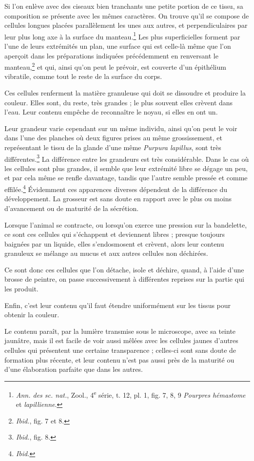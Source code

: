 \documentclass[a4paper, 11pt, oneside, polutonikogreek, french]{article}
\begin{document}
Si l'on enlève avec des ciseaux bien tranchants une petite portion de ce tissu, sa composition se présente avec les mêmes caractères. On trouve qu'il se compose de cellules longues placées parallèlement les unes aux autres, et perpendiculaires par leur plus long axe à la surface du manteau.\footnote{\emph{Ann. des sc. nat.}, Zool., 4\textsuperscript{e} série, t. 12, pl. 1, fig. 7, 8, 9 \emph{Pourpres hémastome} et \emph{lapillienne}.} Les plus superficielles forment par l'une de leurs extrémités un plan, une surface qui est celle-là même que l'on aperçoit dans les préparations indiquées précédemment en renversant le manteau,\footnote{\emph{Ibid.}, fig. 7 et 8.} et qui, ainsi qu'on peut le prévoir, est couverte d'un épithélium vibratile, comme tout le reste de la surface du corps.

Ces cellules renferment la matière granuleuse qui doit se dissoudre et produire la couleur. Elles sont, du reste, très grandes ; le plus souvent elles crèvent dans l'eau. Leur contenu empêche de reconnaître le noyau, si elles en ont un.

Leur grandeur varie cependant sur un même individu, ainsi qu'on peut le voir dans l'une des planches où deux figures prises au même grossissement, et représentant le tissu de la glande d'une même \emph{Purpura lapillus}, sont très différentes.\footnote{\emph{Ibid.}, fig. 8.} La différence entre les grandeurs est très considérable. Dans le cas où les cellules sont plus grandes, il semble que leur extrémité libre se dégage un peu, et par cela même se renfle davantage, tandis que l'autre semble pressée et comme effilée.\footnote{\emph{Ibid.}} Évidemment ces apparences diverses dépendent de la différence du développement. La grosseur est sans doute en rapport avec le plus ou moins d'avancement ou de maturité de la sécrétion.

Lorsque l'animal se contracte, ou lorsqu'on exerce une pression sur la bandelette, ce sont ces cellules qui s'échappent et deviennent libres ; presque toujours baignées par un liquide, elles s'endosmosent et crèvent, alors leur contenu granuleux se mélange au mucus et aux autres cellules non déchirées.

Ce sont donc ces cellules que l'on détache, isole et déchire, quand, à l'aide d'une brosse de peintre, on passe successivement à différentes reprises sur la partie qui les produit.

Enfin, c'est leur contenu qu'il faut étendre uniformément sur les tissus pour obtenir la couleur.

Le contenu paraît, par la lumière transmise sous le microscope, avec sa teinte jaunâtre, mais il est facile de voir aussi mêlées avec les cellules jaunes d'autres cellules qui présentent une certaine transparence ; celles-ci sont sans doute de formation plus récente, et leur contenu n'est pas aussi près de la maturité ou d'une élaboration parfaite que dans les autres.
\end{document}
